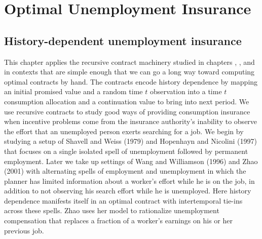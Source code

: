 


\chapter{Optimal Unemployment Insurance\label{uninsur1}}

\section{History-dependent unemployment insurance}   %
This chapter applies the recursive contract machinery studied in
chapters , ,
and  in contexts that are simple enough that we
can go a long way toward computing  optimal contracts by hand.
The contracts encode history dependence by mapping an initial
promised value and a random time $t$ observation into a time $t$ consumption allocation
and a continuation value to bring into next period.  We use recursive
contracts to study good ways of providing consumption insurance  when incentive problems
 come from the insurance authority's
inability to observe the effort that an unemployed person exerts
 searching for a job.  We begin by studying a setup
of Shavell and Weiss (1979) and Hopenhayn and Nicolini (1997)
that focuses on a single isolated spell of unemployment followed by permanent employment.  Later we take up settings of Wang and
Williamson (1996) and Zhao (2001)
with alternating spells of employment and
unemployment in which the planner has limited information
about a  worker's effort while he is on the job, in addition to not
observing his search effort while he is unemployed.
Here history dependence manifests itself in
an optimal contract with intertemporal tie-ins
across these spells.  Zhao uses her model to rationalize unemployment compensation
that replaces a fraction of a worker's earnings on his or her previous job.

  
